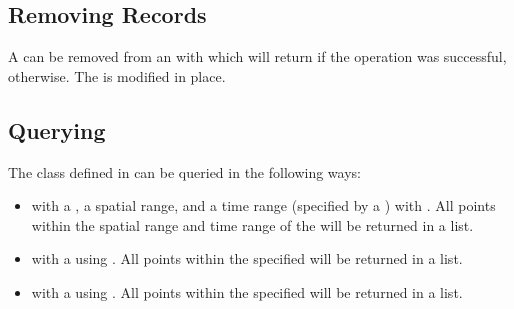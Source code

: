 \documentclass[letterpaper,10pt,english]{sphinxmanual}
\begin{document}
\subsection{Removing Records}
\label{\detokenize{octtree:removing-records}}
\sphinxAtStartPar
A  can be removed from an  with  which will return  if the operation
was successful,  otherwise. The  is modified in place.


\subsection{Querying}
\label{\detokenize{octtree:querying}}
\sphinxAtStartPar
The  class defined in  can be queried in the following ways:
\begin{itemize}
\item {}
\sphinxAtStartPar
with a , a spatial range, and a time range (specified by a ) with
. All points within the spatial range and time range of the  will be
returned in a list.

\item {}
\sphinxAtStartPar
with a  using . All points within the specified  will be returned in a list.

\item {}
\sphinxAtStartPar
with a  using . All points within the specified  will be returned in a list.

\end{itemize}
\end{document}
